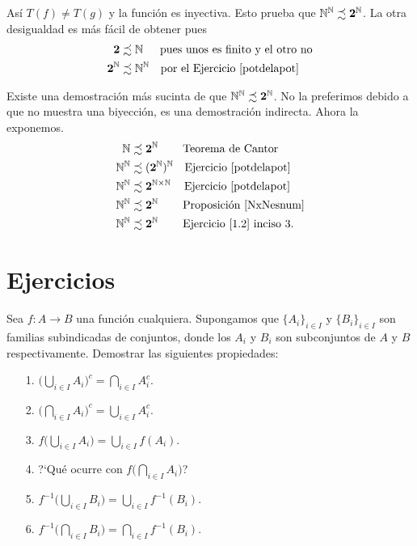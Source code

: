\begin{demo}
Así $T(f)\neq T(g)$ y la función es inyectiva. Esto prueba
que $\mathbb{N}^{\mathbb{N}}\precsim \mathbf{2}^{\mathbb{N}}$. La otra desigualdad es
más fácil de obtener pues
\[
  \begin{split}
      \mathbf{2}&\precsim \mathbb{N}\quad\,\,\, \text{pues unos es finito y el
      otro no}\\
      \mathbf{2}^{\mathbb{N}}&\precsim\mathbb{N}^{\mathbb{N}}\quad \text{por el
      Ejercicio \ref{potdelapot} }
  \end{split}
\]
\end{demo}

Existe una demostración más sucinta de que
$\mathbb{N}^{\mathbb{N}}\precsim\mathbf{2}^{\mathbb{N}}$. No la preferimos debido a que
no muestra una biyección, es una demostración indirecta. Ahora
la exponemos.
\[
  \begin{split}
       \mathbb{N} &\precsim \mathbf{2}^{\mathbb{N}}\quad\quad\,\text{Teorema de
       Cantor}\\
       \mathbb{N}^{\mathbb{N}} &\precsim (\mathbf{2}^{\mathbb{N}})^{\mathbb{N}}\quad\text{Ejercicio
       \ref{potdelapot}}\\
        \mathbb{N}^{\mathbb{N}} &\precsim \mathbf{2}^{\mathbb{N}\times\mathbb{N}}\quad\,\text{Ejercicio
       \ref{potdelapot}}\\
        \mathbb{N}^{\mathbb{N}} &\precsim \mathbf{2}^{\mathbb{N}}\quad\quad\,\text{Proposición  \ref{NxNesnum}}\\
        \mathbb{N}^{\mathbb{N}} &\precsim \mathbf{2}^{\mathbb{N}}\quad\quad\,\text{Ejercicio
       \ref{1.2} inciso 3}.
  \end{split}
\]


\section{Ejercicios}


\begin{ejercicio}\label{propuniarb} Sea $f:A\longrightarrow B$ una función cualquiera.
Supongamos que $\{A_i\}_{i\in I}$ y $\{B_i\}_{i\in I}$ son
familias subindicadas de conjuntos, donde los $A_i$ y $B_i$ son
subconjuntos de $A$ y $B$ respectivamente. Demostrar las
siguientes propiedades:
\end{ejercicio}
\begin{itemize}
\item[1.] $\biggl(\bigcup_{i\in I}A_i\biggr)^c=\bigcap_{i\in
I}A_i^c$.
\item[2.]$\biggl(\bigcap_{i\in I}A_i\biggr)^c=\bigcup_{i\in
I}A_i^c$.
\item[3.] $f\biggl(\bigcup_{i\in I}A_i\biggr)=\bigcup_{i\in
I}f(A_i)$.
\item[4.]?`Qué ocurre con $f\biggl(\bigcap_{i\in I}A_i\biggr)$?
\item[5.] $f^{-1}\biggl(\bigcup_{i\in I}B_i\biggr)=\bigcup_{i\in
I}f^{-1}(B_i)$.
\item[6.]$f^{-1}\biggl(\bigcap_{i\in I}B_i\biggr)=\bigcap_{i\in
I}f^{-1}(B_i)$.
\end{itemize}

